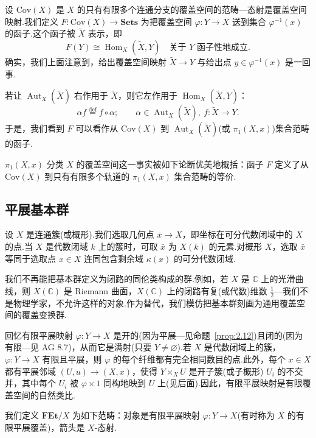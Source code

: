 设 $\mathrm{Cov}(X)$ 是 $X$ 的只有有限多个连通分支的覆盖空间的范畴---态射是覆盖空间映射.我们定义 $F \colon \mathrm{Cov}(X) \to \mathbf{Sets}$ 为把覆盖空间 $\varphi \colon Y \to X$ 送到集合 $\varphi^{-1}(x)$ 的函子.这个函子被 $\widetilde{X}$ 表示，即
\[
F(Y) \cong \operatorname{Hom}_X(\widetilde{X}, Y) \quad \text{关于 } Y \text{ 函子性地成立}.
\]
确实，我们上面注意到，给出覆盖空间映射 $\widetilde{X} \to Y$ 与给出点 $y \in \varphi^{-1}(x)$ 是一回事.

若让 $\operatorname{Aut}_X(\widetilde{X})$ 右作用于 $\widetilde{X}$，则它左作用于 $\operatorname{Hom}_X(\widetilde{X}, Y)$：
\[
\alpha f \overset{\mathrm{def}}{=} f \circ \alpha; \qquad \alpha \in \operatorname{Aut}_X(\widetilde{X}), \ f \colon \widetilde{X} \to Y.
\]
于是，我们看到 $F$ 可以看作从 $\mathrm{Cov}(X)$ 到 $\operatorname{Aut}_X(\widetilde{X})$(或 $\pi_1(X, x)$)集合范畴的函子.

$\pi_1(X, x)$ 分类 $X$ 的覆盖空间这一事实被如下论断优美地概括：函子 $F$ 定义了从 $\mathrm{Cov}(X)$ 到只有有限多个轨道的 $\pi_1(X, x)$ 集合范畴的等价.

\subsection*{平展基本群}

设 $X$ 是连通簇(或概形).我们选取几何点 $\bar{x} \to X$，即坐标在可分代数闭域中的 $X$ 的点.当 $X$ 是代数闭域 $k$ 上的簇时，可取 $\bar{x}$ 为 $X(k)$ 的元素.对概形 $X$，选取 $\bar{x}$ 等同于选取点 $x \in X$ 连同包含剩余域 $\kappa(x)$ 的可分代数闭域.

我们不再能把基本群定义为闭路的同伦类构成的群.例如，若 $X$ 是 $\mathbb{C}$ 上的光滑曲线，则 $X(\mathbb{C})$ 是 Riemann 曲面，$X(\mathbb{C})$ 上的闭路有复(或代数)维数 $\frac{1}{2}$---我们不是物理学家，不允许这样的对象.作为替代，我们模仿把基本群刻画为通用覆盖空间的覆盖变换群.

回忆有限平展映射 $\varphi \colon Y \to X$ 是开的(因为平展---见命题~\ref{prop:2.12})且闭的(因为有限---见 AG 8.7)，从而它是满射(只要 $Y \neq \varnothing$).若 $X$ 是代数闭域上的簇，$\varphi \colon Y \to X$ 有限且平展，则 $\varphi$ 的每个纤维都有完全相同数目的点.此外，每个 $x \in X$ 都有平展邻域 $(U, u) \to (X, x)$，使得 $Y \times_{X} U$ 是开子簇(或子概形) $U_i$ 的不交并，其中每个 $U_i$ 被 $\varphi \times 1$ 同构地映到 $U$ 上(见后面).因此，有限平展映射是有限覆盖空间的自然类比.

我们定义 $\mathbf{FEt}/X$ 为如下范畴：对象是有限平展映射 $\varphi \colon Y \to X$(有时称为 $X$ 的有限平展覆盖)，箭头是 $X$-态射.

